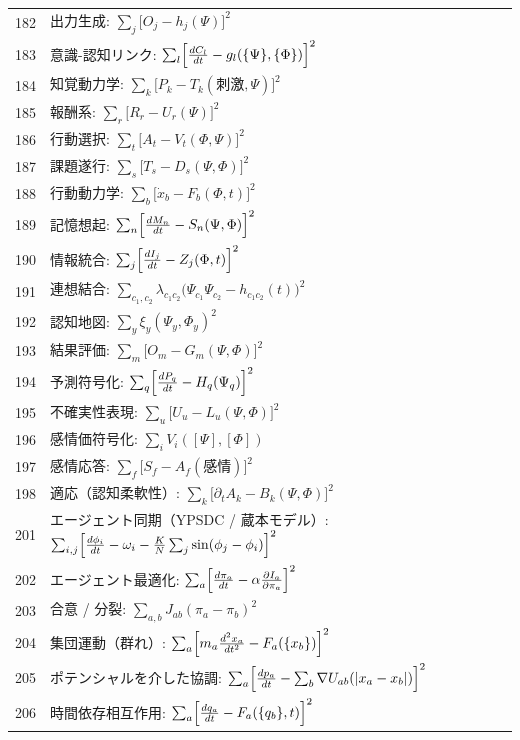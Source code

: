 \documentclass[13pt,a4paper]{ltjsarticle}
\begin{document}
\begin{longtable}{r l}
		182 & 出力生成: $\sum_j\bigl[O_j - h_j(\Psi)\bigr]^2$ \\
		183 & 意識-認知リンク: $\sum_l\Bigl[\frac{dC_l}{dt} - g_l(\{\Psi\},\{\Phi\})\Bigr]^2$ \\
		184 & 知覚動力学: $\sum_k\bigl[P_k - T_k(\text{刺激},\Psi)\bigr]^2$ \\
		185 & 報酬系: $\sum_r\bigl[R_r - U_r(\Psi)\bigr]^2$ \\
		186 & 行動選択: $\sum_t\bigl[A_t - V_t(\Phi,\Psi)\bigr]^2$ \\
		187 & 課題遂行: $\sum_s\bigl[T_s - D_s(\Psi,\Phi)\bigr]^2$ \\
		188 & 行動動力学: $\sum_b\bigl[\dot x_b - F_b(\Phi,t)\bigr]^2$ \\
		189 & 記憶想起: $\sum_n\Bigl[\frac{dM_n}{dt} - S_n(\Psi,\Phi)\Bigr]^2$ \\
		190 & 情報統合: $\sum_j\Bigl[\frac{dI_j}{dt} - Z_j(\Phi,t)\Bigr]^2$ \\
		191 & 連想結合: $\sum_{c_1,c_2}\lambda_{c_1c_2}\bigl(\Psi_{c_1}\Psi_{c_2} - h_{c_1c_2}(t)\bigr)^2$ \\
		192 & 認知地図: $\sum_y\xi_y(\Psi_y,\Phi_y)^2$ \\
		193 & 結果評価: $\sum_m\bigl[O_m - G_m(\Psi,\Phi)\bigr]^2$ \\
		194 & 予測符号化: $\sum_q\Bigl[\frac{dP_q}{dt} - H_q(\Psi_q)\Bigr]^2$ \\
		195 & 不確実性表現: $\sum_u\bigl[U_u - L_u(\Psi,\Phi)\bigr]^2$ \\
		196 & 感情価符号化: $\sum_i V_i([\Psi],[\Phi])$ \\
		197 & 感情応答: $\sum_f\bigl[S_f - A_f(\text{感情})\bigr]^2$ \\
		198 & 適応（認知柔軟性）: $\sum_k\bigl[\partial_t A_k - B_k(\Psi,\Phi)\bigr]^2$ \\
		201 & エージェント同期（YPSDC / 蔵本モデル）: $\sum_{i,j}\Bigl[\frac{d\phi_i}{dt} - \omega_i - \frac{K}{N}\sum_j\sin(\phi_j-\phi_i)\Bigr]^2$ \\
		202 & エージェント最適化: $\sum_a\Bigl[\frac{d\pi_a}{dt} - \alpha\frac{\partial I_a}{\partial\pi_a}\Bigr]^2$ \\
		203 & 合意 / 分裂: $\sum_{a,b}J_{ab}(\pi_a - \pi_b)^2$ \\
		204 & 集団運動（群れ）: $\sum_a\Bigl[m_a\frac{d^2 x_a}{dt^2} - F_a(\{x_b\})\Bigr]^2$ \\
		205 & ポテンシャルを介した協調: $\sum_a\Bigl[\frac{dp_a}{dt} - \sum_b\nabla U_{ab}(|x_a-x_b|)\Bigr]^2$ \\
		206 & 時間依存相互作用: $\sum_a\Bigl[\frac{dq_a}{dt} - F_a(\{q_b\},t)\Bigr]^2$ \\

\end{longtable}
\end{document}
